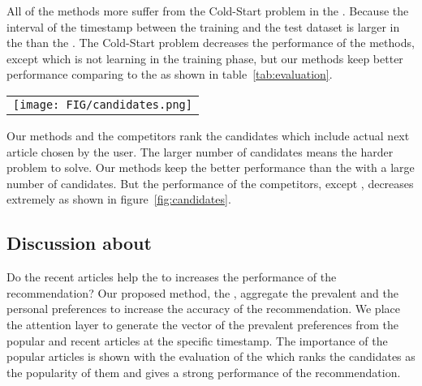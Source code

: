 All of the methods more suffer from the Cold-Start problem in the \dataAdressaTenWeekName.
Because the interval of the timestamp between the training and the test dataset is larger in the \dataAdressaTenWeek than the \dataAdressaOneWeekName.
The Cold-Start problem decreases the performance of the methods, except \compPop which is not learning in the training phase, but our methods keep better performance comparing to the \compPop as shown in table~\ref{tab:evaluation}.

\begin{figure*}[t]
\begin{center}
\begin{tabular}{c}
     \texttt{[image: FIG/candidates.png]} \\
\end{tabular}
\caption{
	The MRR@20 evaluation on the different number of candidate articles.
	The accuracy of methods, except \compPopName, decreases with the larger number of candidates.
	\method keeps the best accuracy among the competitors.
}
\label{fig:candidates}
\end{center}
\end{figure*}

Our methods and the competitors rank the candidates which include actual next article chosen by the user.
The larger number of candidates means the harder problem to solve.
Our methods keep the better performance than the \compPop with a large number of candidates.
But the performance of the competitors, except \compPopName, decreases extremely as shown in figure~\ref{fig:candidates}.

\subsection{Discussion about \method}
\label{sec:exp:discuss}
Do the recent articles help the \method to increases the performance of the recommendation?
Our proposed method, the \methodname, aggregate the prevalent and the personal preferences to increase the accuracy of the recommendation.
We place the attention layer to generate the vector of the prevalent preferences from the popular and recent articles at the specific timestamp.
The importance of the popular articles is shown with the evaluation of the \compPop which ranks the candidates as the popularity of them and gives a strong performance of the recommendation.

